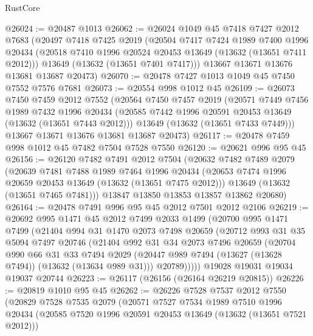 \begin{lexlean}{RustCore}
\begin{coremodule}
@26024 := @20487 @1013
@26062 := @26024
    @1049
    @45
    @7418
    @7427
    @2012
    @7683
    (@20497
      @7418
      @7425
      @2019
      (@20504
        @7417
        @7424
        @1989
        @7400
        @1996
        @20434
        (@20518 @7410 @1996 @20524 @20453 @13649 (@13632 (@13651 @7411 @2012)))
        @13649
        (@13632 (@13651 @7401 @7417)))
      @13667
      @13671
      @13676
      @13681
      @13687
      @20473)
@26070 := @20478 @7427 @1013 @1049 @45 @7450 @7552 @7576 @7681
@26073 := @20554 @998 @1012 @45
@26109 := @26073
    @7450
    @7459
    @2012
    @7552
    (@20564
      @7450
      @7457
      @2019
      (@20571
        @7449
        @7456
        @1989
        @7432
        @1996
        @20434
        (@20585 @7442 @1996 @20591 @20453 @13649 (@13632 (@13651 @7443 @2012)))
        @13649
        (@13632 (@13651 @7433 @7449)))
      @13667
      @13671
      @13676
      @13681
      @13687
      @20473)
@26117 := @20478 @7459 @998 @1012 @45 @7482 @7504 @7528 @7550
@26120 := @20621 @996 @95 @45
@26156 := @26120
    @7482
    @7491
    @2012
    @7504
    (@20632
      @7482
      @7489
      @2079
      (@20639
        @7481
        @7488
        @1989
        @7464
        @1996
        @20434
        (@20653 @7474 @1996 @20659 @20453 @13649 (@13632 (@13651 @7475 @2012)))
        @13649
        (@13632 (@13651 @7465 @7481)))
      @13847
      @13850
      @13853
      @13857
      @13862
      @20680)
@26164 := @20478 @7491 @996 @95 @45 @2012 @7501 @2012 @2106
@26219 := @20692
    @995
    @1471
    @45
    @2012
    @7499
    @2033
    @1499
    (@20700
      @995
      @1471
      @7499
      (@21404
        @994
        @31
        @1470
        @2073
        @7498
        @20659
        (@20712
          @993
          @31
          @35
          @5094
          @7497
          @20746
          (@21404
            @992
            @31
            @34
            @2073
            @7496
            @20659
            (@20704
              @990
              @66
              @31
              @33
              @7494
              @2029
              (@20447 @989 @7494 (@13627 (@13628 @7494)) (@13632 (@13634 @989 @31)))
              @20789)))))
    @19028
    @19031
    @19034
    @19037
    @20744
@26223 := @26117 (@26156 (@26164 @26219 @20815))
@26226 := @20819 @1010 @95 @45
@26262 := @26226
    @7528
    @7537
    @2012
    @7550
    (@20829
      @7528
      @7535
      @2079
      (@20571
        @7527
        @7534
        @1989
        @7510
        @1996
        @20434
        (@20585 @7520 @1996 @20591 @20453 @13649 (@13632 (@13651 @7521 @2012)))

\end{coremodule}
\end{lexlean}
